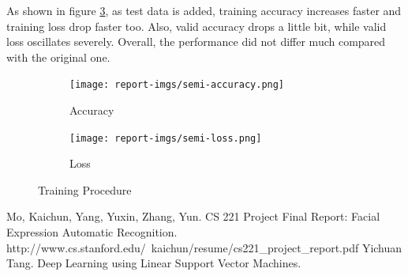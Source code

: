 \documentclass[fleqn,a4paper,12pt]{article}
\begin{document}
As shown in figure \ref{fig:semi}, as test data is added, training accuracy increases faster and training loss drop faster too. Also, valid accuracy drops a little bit, while valid loss oscillates severely. Overall, the performance did not differ much compared with the original one.

\begin{figure}[H]
\centering
\begin{subfigure}{.5\textwidth}
  \centering
  \texttt{[image: report-imgs/semi-accuracy.png]}
  \caption{Accuracy}
  \label{fig:sub1}
\end{subfigure}%
\begin{subfigure}{.5\textwidth}
  \centering
  \texttt{[image: report-imgs/semi-loss.png]}
  \caption{Loss}
  \label{fig:sub2}
\end{subfigure}
\caption{Training Procedure}
\label{fig:semi}
\end{figure}


\clearpage

\begin{thebibliography}{99}
Mo, Kaichun, Yang, Yuxin, Zhang, Yun. CS  221  Project  Final  Report:  Facial  Expression  Automatic  Recognition. http://www.cs.stanford.edu/~kaichun/resume/cs221\_project\_report.pdf
Yichuan Tang. Deep Learning using Linear Support Vector Machines.  
\end{thebibliography}
\end{document}
